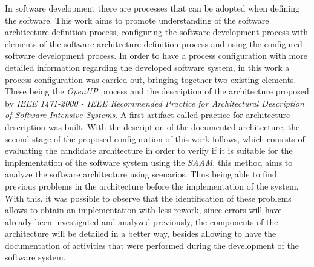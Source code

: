 In software development there are processes that can be adopted when defining the software. This work aims to promote understanding of the software architecture definition process, configuring the software development process with elements of the software architecture definition process and using the configured software development process. In order to have a process configuration with more detailed information regarding the developed software system, in this work a process configuration was carried out, bringing together two existing elements. 
These being the \emph{\acrfull{OpenUP}} process and the description of the architecture proposed by \emph{IEEE 1471-2000 - IEEE Recommended Practice for Architectural Description of Software-Intensive Systems}. 
A first artifact called practice for architecture description was built. With the description of the documented architecture, the second stage of the proposed configuration of this work follows, which consists of evaluating the candidate architecture in order to verify if it is suitable for the implementation of the software system using the 
\emph{\acrfull{SAAM}}, this method aims to analyze the software architecture using scenarios. Thus being able to find previous problems in the architecture before the implementation of the system. With this, it was possible to observe that the identification of these problems allows to obtain an implementation with less rework, since errors will have already been investigated and analyzed previously, the components of the architecture will be detailed in a better way, besides allowing to have the documentation of activities that were performed during the development of the software system.